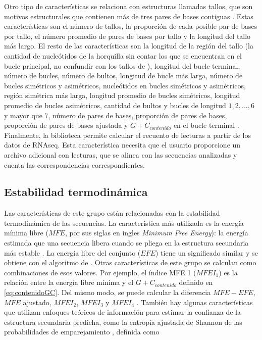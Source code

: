 Otro tipo de características se relaciona con estructuras llamadas tallos, que son motivos estructurales que contienen más de tres pares de bases contiguas
\citep{ng2007novo}. Estas características son el número de tallos, la proporción de cada posible par de bases por tallo, el número promedio de pares de bases
por tallo y la longitud del tallo más largo. El resto de las características son la longitud de la región del tallo (la cantidad de nucleótidos de la horquilla
sin contar los que se encuentran en el bucle principal, no confundir con los tallos de \cite{ng2007novo}), longitud del bucle terminal, número de bucles, número
de bultos, longitud de bucle más larga, número de bucles simétricos y asimétricos, nucleótidos en bucles simétricos y asimétricos, región simétrica más larga,
longitud promedio de bucles simétricos, longitud promedio de bucles asimétricos, cantidad de bultos y bucles de longitud $ 1,2, ..., 6$ y mayor que $7$, número
de pares de bases, proporción de pares de bases, proporción de pares de bases ajustada y $G+C_{contenido}$ en el bucle terminal \citep{Lopes2014}. Finalmente,
la biblioteca permite calcular el recuento de lecturas a partir de los datos de RNAseq. Esta característica necesita que el usuario proporcione un archivo
adicional con lecturas, que se alinea con las secuencias analizadas y cuenta las correspondencias correspondientes.

\subsection{Estabilidad termodinámica}

Las características de este grupo están relacionadas con la estabilidad termodinámica de las secuencias. La característica más utilizada es la energía
mínima libre ($MFE$, por sus siglas en ingles \textit{Minimum Free Energy}): la energía estimada que una secuencia libera cuando se pliega en la
estructura secundaria más estable \citep{zuker1981optimal}. La energía libre del conjunto ($EFE$) tiene un significado similar y se obtiene con el
algoritmo de \cite{mccaskill1990}. Otras características de este grupo se calculan como combinaciones de esos valores. Por ejemplo, el índice MFE 1
($MFEI_{1}$) es la relación entre la energía libre mínima y el ${G+C}_{contenido}$ definido en \ref{eq:contenidoGC}. Del mismo modo, se puede calcular
la diferencia $MFE-EFE$, $MFE$ ajustado, $MFEI_{2}$, $MFEI_{3}$ y $MFEI_{4}$ \citep{batuwita2009micropred}. También hay algunas características que
utilizan enfoques teóricos de información para estimar la confianza de la estructura secundaria predicha, como la entropía ajustada de Shannon de las
probabilidades de emparejamiento \citep{ng2007novo}, definida como

